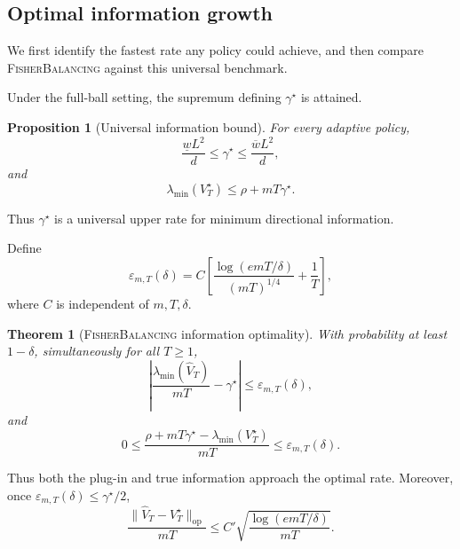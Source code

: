 \documentclass[10pt,twoside,letterpaper]{article}
\newtheorem{theorem}{Theorem}
\newtheorem{proposition}{Proposition}
\newcommand{\op}{\mathrm{op}}
\newcommand{\norm}[1]{\lVert #1\rVert}
\newcommand{\FB}{\textnormal{\textsc{FisherBalancing}}}
\newcommand{\Vhat}{\widehat V}
\begin{document}
\subsection{Optimal information growth}
\label{sec:information-rate}

We first identify the fastest rate any policy could achieve, and then
compare \FB{} against this universal benchmark.

Under the full-ball setting, the supremum defining $\gamma^\star$ is
attained.

\begin{proposition}[Universal information bound]
\label{prop:ceiling}
For every adaptive policy,
\begin{equation}
\frac{\underline wL^2}{d}
\le
\gamma^\star
\le
\frac{\overline wL^2}{d},
\end{equation}
and
\begin{equation}
\lambda_{\min}(V_T^\star)
\le
\rho+mT\gamma^\star.
\label{eq:ceiling}
\end{equation}
\end{proposition}

Thus $\gamma^\star$ is a universal upper rate for minimum directional
information.

Define
\begin{equation}
\varepsilon_{m,T}(\delta)
=
C
\left[
\frac{\log(emT/\delta)}
{(mT)^{1/4}}
+
\frac1T
\right],
\label{eq:rate-error}
\end{equation}
where $C$ is independent of $m,T,\delta$.

\begin{theorem}[\FB{} information optimality]
\label{thm:information}
With probability at least $1-\delta$, simultaneously for all $T\ge1$,
\begin{equation}
\left|
\frac{\lambda_{\min}(\Vhat_T)}{mT}
-
\gamma^\star
\right|
\le
\varepsilon_{m,T}(\delta),
\label{eq:plugin-rate}
\end{equation}
and
\begin{equation}
0
\le
\frac{
\rho+mT\gamma^\star
-
\lambda_{\min}(V_T^\star)
}{
mT
}
\le
\varepsilon_{m,T}(\delta).
\label{eq:true-rate}
\end{equation}
\end{theorem}

Thus both the plug-in and true information approach the optimal rate.
Moreover, once
$\varepsilon_{m,T}(\delta)\le\gamma^\star/2$,
\begin{equation}
\frac{
\norm{\Vhat_T-V_T^\star}_{\op}
}{
mT
}
\le
C'
\sqrt{
\frac{
\log(emT/\delta)
}{
mT
}
}.
\label{eq:tracking}
\end{equation}
\end{document}
